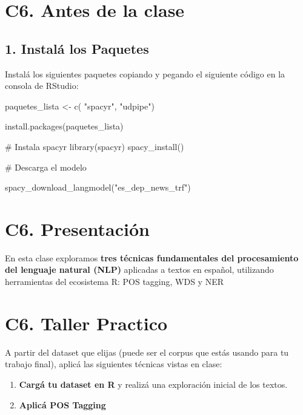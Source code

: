 \documentclass[
  letterpaper,
  DIV=11,
  numbers=noendperiod]{scrreprt}
\newenvironment{Shaded}{\begin{snugshade}}{\end{snugshade}}
\newcommand{\CommentTok}[1]{\textcolor[rgb]{0.37,0.37,0.37}{#1}}
\newcommand{\FunctionTok}[1]{\textcolor[rgb]{0.28,0.35,0.67}{#1}}
\newcommand{\NormalTok}[1]{\textcolor[rgb]{0.00,0.23,0.31}{#1}}
\newcommand{\OtherTok}[1]{\textcolor[rgb]{0.00,0.23,0.31}{#1}}
\newcommand{\StringTok}[1]{\textcolor[rgb]{0.13,0.47,0.30}{#1}}
\begin{document}
\chapter{C6. Antes de la clase}\label{c6.-antes-de-la-clase}

\section{\texorpdfstring{\textbf{1. Instalá los
Paquetes}}{1. Instalá los Paquetes}}\label{instaluxe1-los-paquetes-2}

Instalá los siguientes paquetes copiando y pegando el siguiente código
en la consola de RStudio:

\begin{Shaded}
\begin{Highlighting}[]

\NormalTok{paquetes\_lista }\OtherTok{\textless{}{-}} \FunctionTok{c}\NormalTok{(}
  \StringTok{"spacyr"}\NormalTok{, }\StringTok{"udpipe"}\NormalTok{)}

\FunctionTok{install.packages}\NormalTok{(paquetes\_lista)}

\CommentTok{\# Instala spacyr}
\FunctionTok{library}\NormalTok{(spacyr)}
\FunctionTok{spacy\_install}\NormalTok{()}

\CommentTok{\# Descarga el modelo}

\FunctionTok{spacy\_download\_langmodel}\NormalTok{(}\StringTok{"es\_dep\_news\_trf"}\NormalTok{)}
\end{Highlighting}
\end{Shaded}

\chapter{C6. Presentación}\label{c6.-presentaciuxf3n}

En esta clase exploramos \textbf{tres técnicas fundamentales del
procesamiento del lenguaje natural (NLP)} aplicadas a textos en español,
utilizando herramientas del ecosistema R: POS tagging, WDS y NER

\chapter{C6. Taller Practico}\label{c6.-taller-practico}

A partir del dataset que elijas (puede ser el corpus que estás usando
para tu trabajo final), aplicá las siguientes técnicas vistas en clase:

\begin{enumerate}
\def\labelenumi{\arabic{enumi}.}
\item
  \textbf{Cargá tu dataset en R} y realizá una exploración inicial de
  los textos.
\item
  \textbf{Aplicá POS Tagging}
\end{enumerate}
\end{document}
